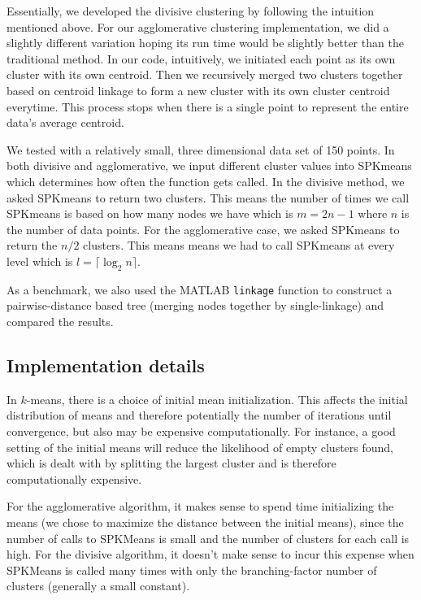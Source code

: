 \documentclass[../tech_report_1.tex]{subfiles}
\begin{document}
Essentially, we developed the divisive clustering by following the
intuition mentioned above. For our agglomerative clustering implementation,
we did a slightly different variation hoping its run time would be
slightly better than the traditional method. In our code, intuitively,
we initiated each point as its own cluster with its own centroid.
Then we recursively merged two clusters together based on centroid
linkage to form a new cluster with its own cluster centroid everytime.
This process stops when there is a single point to represent the entire
data's average centroid.

We tested with a relatively small,
three dimensional data set of 150 points. In both 
divisive and agglomerative, we input different cluster values into
SPKmeans which determines how often the function gets called. In the
divisive method, we asked SPKmeans to return two clusters.
This means the number of times we call SPKmeans
is based on how many nodes we have which is $m=2n-1$ where $n$ is
the number of data points. For the agglomerative case, we asked SPKmeans to
return the $n/2$ clusters. This means means we had to call SPKmeans
at every level which is $l=\lceil\log_{2}n\rceil$.


As a benchmark, we also used the MATLAB \texttt{linkage} function to construct a pairwise-distance based tree (merging nodes together by single-linkage) and compared the results.

\subsection{Implementation details}

In $k$-means, there is a choice of initial mean initialization. This affects the initial distribution of means and therefore potentially the number of iterations until convergence, but also may be expensive computationally. For instance, a good setting of the initial means will reduce the likelihood of empty clusters found, which is dealt with by splitting the largest cluster and is therefore computationally expensive.

For the agglomerative algorithm, it makes sense to spend time initializing the means (we chose to maximize the distance between the initial means), since the number of calls to SPKMeans is small and the number of clusters for each call is high. For the divisive algorithm, it doesn't make sense to incur this expense when SPKMeans is called many times with only the branching-factor number of clusters (generally a small constant).
\end{document}
